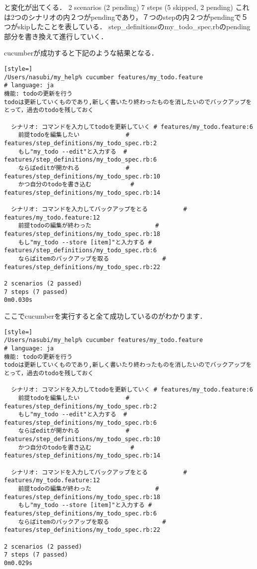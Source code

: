 と変化が出てくる．
2 scenarios (2 pending)
7 steps (5 skipped, 2 pending)
これは2つのシナリオの内２つがpendingであり，７つのstepの内２つがpendingで５つがskipしたことを表している．
step\_definitionsのmy\_todo\_spec.rbのpending部分を書き換えて進行していく．

cucumberが成功すると下記のような結果となる．
\begin{lstlisting}[style=]
/Users/nasubi/my_help% cucumber features/my_todo.feature 
# language: ja
機能: todoの更新を行う
todoは更新していくものであり,新しく書いたり終わったものを消したいのでバックアップをとって，過去のtodoを残しておく

  シナリオ: コマンドを入力してtodoを更新していく # features/my_todo.feature:6
    前提todoを編集したい             # features/step_definitions/my_todo_spec.rb:2
    もし"my_todo --edit"と入力する  # features/step_definitions/my_todo_spec.rb:6
    ならばeditが開かれる             # features/step_definitions/my_todo_spec.rb:10
    かつ自分のtodoを書き込む           # features/step_definitions/my_todo_spec.rb:14

  シナリオ: コマンドを入力してバックアップをとる          # features/my_todo.feature:12
    前提todoの編集が終わった                  # features/step_definitions/my_todo_spec.rb:18
    もし"my_todo --store [item]"と入力する # features/step_definitions/my_todo_spec.rb:6
    ならばitemのバックアップを取る               # features/step_definitions/my_todo_spec.rb:22

2 scenarios (2 passed)
7 steps (7 passed)
0m0.030s

\end{lstlisting}
ここでcucumberを実行すると全て成功しているのがわかります．
\begin{lstlisting}[style=]
/Users/nasubi/my_help% cucumber features/my_todo.feature              
# language: ja
機能: todoの更新を行う
todoは更新していくものであり,新しく書いたり終わったものを消したいのでバックアップをとって，過去のtodoを残しておく

  シナリオ: コマンドを入力してtodoを更新していく # features/my_todo.feature:6
    前提todoを編集したい             # features/step_definitions/my_todo_spec.rb:2
    もし"my_todo --edit"と入力する  # features/step_definitions/my_todo_spec.rb:6
    ならばeditが開かれる             # features/step_definitions/my_todo_spec.rb:10
    かつ自分のtodoを書き込む           # features/step_definitions/my_todo_spec.rb:14

  シナリオ: コマンドを入力してバックアップをとる          # features/my_todo.feature:12
    前提todoの編集が終わった                  # features/step_definitions/my_todo_spec.rb:18
    もし"my_todo --store [item]"と入力する # features/step_definitions/my_todo_spec.rb:6
    ならばitemのバックアップを取る               # features/step_definitions/my_todo_spec.rb:22

2 scenarios (2 passed)
7 steps (7 passed)
0m0.029s

\end{lstlisting}

